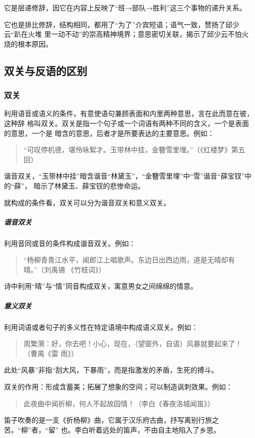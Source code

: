 \documentclass[final,oneside]{ctexbook}
\newenvironment{equotation}{\begin{quotation}\kaishu}{\end{quotation}}
\begin{document}
它是层递修辞，因它在内容上反映了“班→部队→胜利”这三个事物的递升关系。

它也是排比修辞，结构相同，都用了“为了”介宾短语；语气一致，赞扬了邱少云“趴在火堆
里一动不动”的崇高精神境界；意思密切关联，揭示了邱少云不怕火烧的根本原因。

\subsection{双关与反语的区别}

\subsubsection{双关}

利用语音或语义的条件，有意使语句兼顾表面和内里两种意思，言在此而意在彼，这种辞
格叫双关。双关是指一个句子或一个词语有两种不同的含义，一个是表面的意思，一个是
暗含的意思，后者才是所要表达的主要意思。例如：

\begin{equotation}
  “可叹停机德，堪怜咏絮才。玉带林中挂，金簪雪里埋。”（《红楼梦》第五回）
\end{equotation}
谐音双关，“玉带林中挂”暗含谐音“林黛玉”，“金簪雪里埋”中“雪”谐音“薛宝钗”中的“薛”，
暗示了林黛玉、薛宝钗的悲惨命运。

就构成的条件看，双关可以分为谐音双关和意义双关。

\subparagraph{谐音双关}利用音同或音的条件构成谐音双关。例如：

\begin{equotation}
  “杨柳青青江水平，闻郎江上唱歌声。东边日出西边雨，道是无晴却有晴。”（刘禹锡
  《竹枝词》）
\end{equotation}
诗中利用“晴”与“情”同音构成双关，寓意男女之间绵绵的情意。

\subparagraph{意义双关}利用词语或者句子的多义性在特定语境中构成语义双关。例如：

\begin{equotation}
  周繁漪：好，你去吧！小心，现在，（望窗外，自语）风暴就要起来了！（曹禺《雷
  雨》）
\end{equotation}
此处“风暴”非指“刮大风，下暴雨”，而是指激发的矛盾，生死的搏斗。

双关的作用：形成含蓄美；拓展了想象的空间；可以制造讽刺效果。例如：

\begin{equotation}
  此夜曲中闻折柳，何人不起故园情！（李白《春夜洛城闻笛》）
\end{equotation}
笛子吹奏的是一支《折杨柳》曲，它属于汉乐府古曲，抒写离别行旅之苦。“柳”者，“留”
也。李白听着远处的笛声，不由自主地陷入了乡思。
\end{document}

